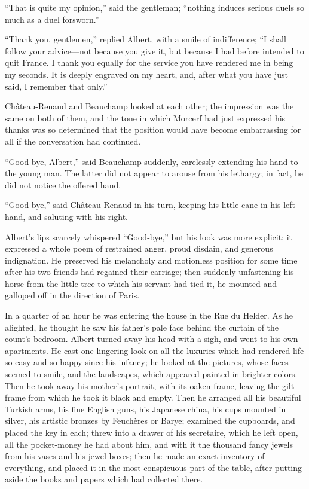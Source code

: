 “That is quite my opinion,” said the gentleman; “nothing induces
serious duels so much as a duel forsworn.”

“Thank you, gentlemen,” replied Albert, with a smile of indifference;
“I shall follow your advice—not because you give it, but because I had
before intended to quit France. I thank you equally for the service you
have rendered me in being my seconds. It is deeply engraved on my
heart, and, after what you have just said, I remember that only.”

Château-Renaud and Beauchamp looked at each other; the impression was
the same on both of them, and the tone in which Morcerf had just
expressed his thanks was so determined that the position would have
become embarrassing for all if the conversation had continued.

“Good-bye, Albert,” said Beauchamp suddenly, carelessly extending his
hand to the young man. The latter did not appear to arouse from his
lethargy; in fact, he did not notice the offered hand.

“Good-bye,” said Château-Renaud in his turn, keeping his little cane in
his left hand, and saluting with his right.

Albert’s lips scarcely whispered “Good-bye,” but his look was more
explicit; it expressed a whole poem of restrained anger, proud disdain,
and generous indignation. He preserved his melancholy and motionless
position for some time after his two friends had regained their
carriage; then suddenly unfastening his horse from the little tree to
which his servant had tied it, he mounted and galloped off in the
direction of Paris.

In a quarter of an hour he was entering the house in the Rue du Helder.
As he alighted, he thought he saw his father’s pale face behind the
curtain of the count’s bedroom. Albert turned away his head with a
sigh, and went to his own apartments. He cast one lingering look on all
the luxuries which had rendered life so easy and so happy since his
infancy; he looked at the pictures, whose faces seemed to smile, and
the landscapes, which appeared painted in brighter colors. Then he took
away his mother’s portrait, with its oaken frame, leaving the gilt
frame from which he took it black and empty. Then he arranged all his
beautiful Turkish arms, his fine English guns, his Japanese china, his
cups mounted in silver, his artistic bronzes by Feuchères or Barye;
examined the cupboards, and placed the key in each; threw into a drawer
of his secretaire, which he left open, all the pocket-money he had
about him, and with it the thousand fancy jewels from his vases and his
jewel-boxes; then he made an exact inventory of everything, and placed
it in the most conspicuous part of the table, after putting aside the
books and papers which had collected there.

